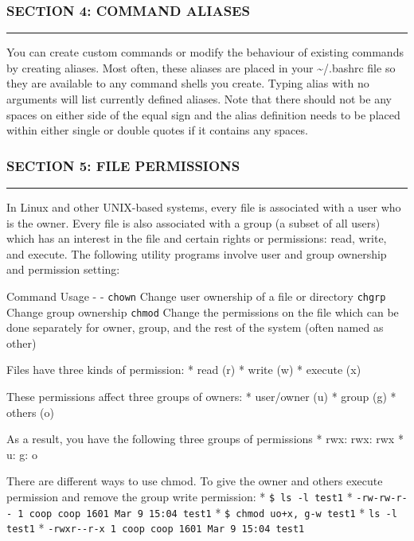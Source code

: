 \subsubsection{SECTION 4: COMMAND
ALIASES}\label{section-4-command-aliases}

\begin{center}\rule{3in}{0.4pt}\end{center}

You can create custom commands or modify the behaviour of existing
commands by creating aliases. Most often, these aliases are placed in
your \textasciitilde{}/.bashrc file so they are available to any command
shells you create. Typing alias with no arguments will list currently
defined aliases. Note that there should not be any spaces on either side
of the equal sign and the alias definition needs to be placed within
either single or double quotes if it contains any spaces.

\subsubsection{SECTION 5: FILE
PERMISSIONS}\label{section-5-file-permissions}

\begin{center}\rule{3in}{0.4pt}\end{center}

In Linux and other UNIX-based systems, every file is associated with a
user who is the owner. Every file is also associated with a group (a
subset of all users) which has an interest in the file and certain
rights or permissions: read, write, and execute. The following utility
programs involve user and group ownership and permission setting:

Command \textbar{} Usage - \textbar{} - \texttt{chown} \textbar{} Change
user ownership of a file or directory \texttt{chgrp} \textbar{} Change
group ownership \texttt{chmod} \textbar{} Change the permissions on the
file which can be done separately for owner, group, and the rest of the
system (often named as other)

Files have three kinds of permission: * read (r) * write (w) * execute
(x)

These permissions affect three groups of owners: * user/owner (u) *
group (g) * others (o)

As a result, you have the following three groups of permissions * rwx:
rwx: rwx * u: g: o

There are different ways to use chmod. To give the owner and others
execute permission and remove the group write permission: *
\texttt{\$ ls -l test1} *
\texttt{-rw-rw-r-\/- 1 coop coop 1601 Mar 9 15:04 test1} *
\texttt{\$ chmod uo+x, g-w test1} * \texttt{ls -l test1} *
\texttt{-rwxr-\/-r-x 1 coop coop 1601 Mar 9 15:04 test1}

